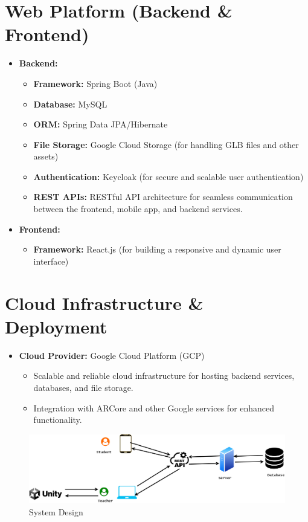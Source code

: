 \documentclass[11pt,                                          %
a4paper,                                       %
twoside]{report}                               %
\begin{document}
\section{Web Platform (Backend \& Frontend)}
\begin{itemize}
	\item \textbf{Backend:}
	\begin{itemize}
		\item \textbf{Framework:} Spring Boot (Java)
		\item \textbf{Database:} MySQL
		\item \textbf{ORM:} Spring Data JPA/Hibernate
		\item \textbf{File Storage:} Google Cloud Storage (for handling GLB files and other assets)
		\item \textbf{Authentication:} Keycloak (for secure and scalable user authentication)
		\item \textbf{REST APIs:} RESTful API architecture for seamless communication between the frontend, mobile app, and backend services.
	\end{itemize}
	
	\item \textbf{Frontend:}
	\begin{itemize}
		\item \textbf{Framework:} React.js (for building a responsive and dynamic user interface)
	\end{itemize}
\end{itemize}

\section{Cloud Infrastructure \& Deployment}
\begin{itemize}
	\item \textbf{Cloud Provider:} Google Cloud Platform (GCP)
	\begin{itemize}
		\item Scalable and reliable cloud infrastructure for hosting backend services, databases, and file storage.
		\item Integration with ARCore and other Google services for enhanced functionality.
	\end{itemize}
\end{itemize}

\begin{figure}[htbp]
	\centering
	\includegraphics[width=1\textwidth]{images/system1.png}
	\caption{System Design}
	\label{fig:sample}
\end{figure}

	
	
	
\end{document}
